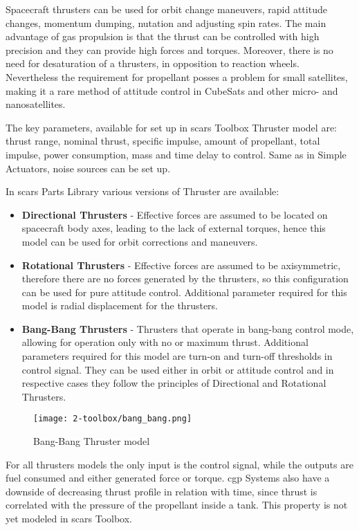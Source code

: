         Spacecraft thrusters can be used for orbit change maneuvers, rapid attitude changes, momentum dumping, nutation and adjusting spin rates. The main advantage of gas propulsion is that the thrust can be controlled with high precision and they can provide high forces and torques. Moreover, there is no need for desaturation of a thrusters, in opposition to reaction wheels. Nevertheless the requirement for propellant posses a problem for small satellites, making it a rare method of attitude control in CubeSats and other micro- and nanosatellites. 
        
        The key parameters, available for set up in \ac{scars} Toolbox Thruster model are: thrust range, nominal thrust, specific impulse, amount of propellant, total impulse, power consumption, mass and time delay to control. Same as in Simple Actuators, noise sources can be set up.

        In \ac{scars} Parts Library various versions of Thruster are available:
        \begin{itemize}
            \item \textbf{Directional Thrusters} - Effective forces are assumed to be located on spacecraft body axes, leading to the lack of external torques, hence this model can be used for orbit corrections and maneuvers.
            \item \textbf{Rotational Thrusters} - Effective forces are assumed to be axisymmetric, therefore there are no forces generated by the thrusters, so this configuration can be used for pure attitude control. Additional parameter required for this model is radial displacement for the thrusters. 
            \item \textbf{Bang-Bang Thrusters} - Thrusters that operate in bang-bang control mode, allowing for operation only with no or maximum thrust. Additional parameters required for this model are turn-on and turn-off thresholds in control signal. They can be used either in orbit or attitude control and in respective cases they follow the principles of Directional and Rotational Thrusters.
        \end{itemize}

        \begin{figure}[H]
            \centering
            \texttt{[image: 2-toolbox/bang\_bang.png]}
            \caption{Bang-Bang Thruster model}
            \label{fig:bang_bang}
        \end{figure}


        For all thrusters models the only input is the control signal, while the outputs are fuel consumed and either generated force or torque. \ac{cgp} Systems also have a downside of decreasing thrust profile in relation with time, since thrust is correlated with the pressure of the propellant inside a tank. This property is not yet modeled in \ac{scars} Toolbox. %

